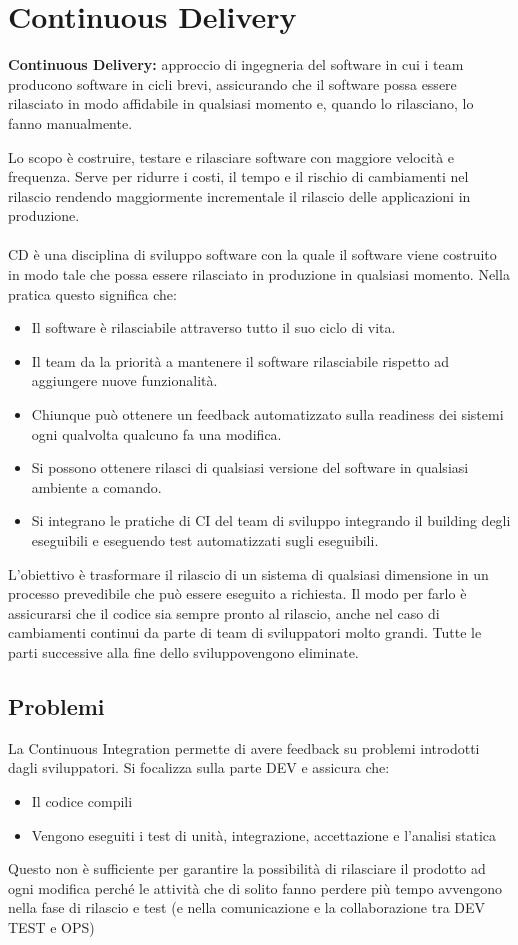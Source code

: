 \section{Continuous Delivery}
\begin{mdframed}
    \textbf{Continuous Delivery:} approccio di ingegneria del software in cui i team producono software in cicli brevi, assicurando che il software possa essere rilasciato in modo affidabile in qualsiasi momento e, quando lo rilasciano, lo fanno manualmente.
\end{mdframed}
Lo scopo è costruire, testare e rilasciare software con maggiore velocità e frequenza. 
Serve per ridurre i costi, il tempo e il rischio di cambiamenti nel rilascio rendendo maggiormente incrementale il rilascio delle applicazioni in produzione. \\ \\
CD è una disciplina di sviluppo software con la quale il software viene costruito in modo tale che possa essere rilasciato in produzione in qualsiasi momento.
Nella pratica questo significa che:
\begin{itemize}
    \item Il software è rilasciabile attraverso tutto il suo ciclo di vita.
    \item Il team da la priorità a mantenere il software rilasciabile rispetto ad aggiungere nuove funzionalità.
    \item Chiunque può ottenere un feedback automatizzato sulla readiness dei sistemi ogni qualvolta qualcuno fa una modifica.
    \item Si possono ottenere rilasci di qualsiasi versione del software in qualsiasi ambiente a comando.
    \item Si integrano le pratiche di CI del team di sviluppo integrando il building degli eseguibili e eseguendo test automatizzati sugli eseguibili.
\end{itemize}
L’obiettivo è trasformare il rilascio di un sistema di qualsiasi dimensione in un processo prevedibile che può essere eseguito a richiesta.
Il modo per farlo è assicurarsi che il codice sia sempre pronto al rilascio, anche nel caso di cambiamenti continui da parte di team di sviluppatori molto grandi.
Tutte le parti successive alla fine dello sviluppovengono eliminate.

\subsection{Problemi}
La Continuous Integration permette di avere feedback su problemi introdotti
dagli sviluppatori.
Si focalizza sulla parte DEV e assicura che:
\begin{itemize}
    \item Il codice compili
    \item Vengono eseguiti i test di unità, integrazione, accettazione e l’analisi statica
\end{itemize}
Questo non è sufficiente per garantire la possibilità di rilasciare il prodotto ad ogni modifica perché le attività che di solito fanno perdere più tempo avvengono nella fase di rilascio e test (e nella comunicazione e la collaborazione tra DEV TEST e OPS)


